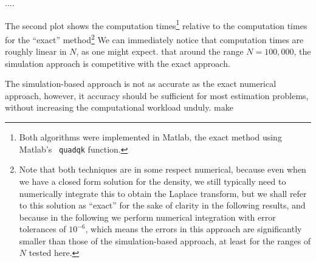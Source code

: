 ....





The second plot shows the computation times\footnote{Both algorithms
  were implemented in Matlab, the exact method using Matlab's {\tt
    quadqk} function. } relative to the computation times for the
``exact'' method\footnote{Note that both techniques are in some
  respect numerical, because even when we have a closed form solution
  for the density, we still typically need to numerically integrate
  this to obtain the Laplace transform, but we shall refer to this
  solution as ``exact'' for the sake of clarity in the following
  results, and because in the following we perform numerical
  integration with error tolerances of $10^{-6}$, which means the
  errors in this approach are significantly smaller than those of the
  simulation-based approach, at least for the ranges of $N$ tested
  here.}  We can immediately notice that computation times are roughly
linear in $N$, as one might expect. that around the range $N=100,000$,
the simulation approach is competitive with the exact approach.

The simulation-based approach is not as accurate as the exact
numerical approach, however, it accuracy should be sufficient for most
estimation problems, without increasing the computational workload
unduly.
make



